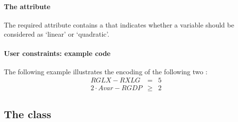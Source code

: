 \paragraph{The  attribute}
The required  attribute contains a  that indicates whether a variable should be considered as `linear' or `quadratic'.

\paragraph{User constraints: example code}
The following example illustrates the encoding of the following two :
\begin{eqnarray}
  RGLX - RXLG  &=& 5 \\
  2\cdot Avar - RGDP &\geq& 2
\end{eqnarray}





\subsection{The \FBC {} class}
\label{listofkeyvaluepairs-class}

